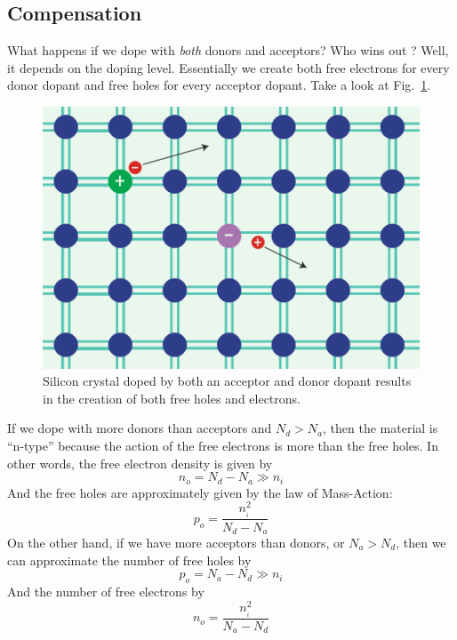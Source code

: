 \subsection{Compensation}
What happens if we dope with \textit{both} donors and acceptors?  Who wins out ?  Well, it depends on the doping level.  Essentially we create both free electrons for every donor dopant and free holes for every acceptor dopant.  Take a look at Fig.~\ref{fig:silicon_dopant_both}.
\begin{figure}[tb]
\begin{center}
\includegraphics[width=.5\columnwidth]{silicon_dopant_both}
\end{center}
\caption{Silicon crystal doped by both an acceptor and donor dopant results in the creation of both free holes and electrons. }
\label{fig:silicon_dopant_both}
\end{figure}

If we dope with more donors than acceptors and $N_d > N_a$, then the material is “n-type” because the action of the free electrons is more than the free holes.  In other words, the free electron density is given by
\begin{equation}
        {n_o} = {N_d} - {N_a} \gg {n_i}
\end{equation}
And the free holes are approximately given by the law of Mass-Action:
\begin{equation}
        {p_o} = \frac{{n_{_i}^2}}{{{N_d} - {N_a}}}
\end{equation}
On the other hand, if we have more acceptors than donors, or  $N_a > N_d$, then we can approximate the number of free holes by
\begin{equation}
        {p_o} = {N_a} - {N_d} \gg {n_i}
\end{equation}
And the number of free electrons by
\begin{equation}
        {n_o} = \frac{{n_{_i}^2}}{{{N_a} - {N_d}}}
\end{equation}
